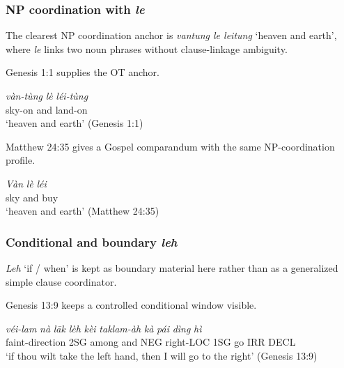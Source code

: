 \documentclass[
  11pt,
  a4paper,
]{article}
\newcommand{\tdim}[1]{\textit{#1}}
\newcommand{\tdimword}[1]{\textit{#1}}
\renewcommand{\textsc}[1]{{\footnotesize\MakeUppercase{#1}}}
\newcommand{\glossquote}[1]{`#1'}
\begin{document}
\subsubsection{\texorpdfstring{NP coordination with
\tdim{le}}{NP coordination with }}\label{np-coordination-with}

The clearest NP coordination anchor is \tdim{vantung le leitung}
\glossquote{heaven and earth}, where \tdim{le} links two noun phrases
without clause-linkage ambiguity.

Genesis 1:1 supplies the OT anchor.

\begin{exe}
\ex \label{ex:coord-le-np}
\gll \tdimword{vàn-tùng} \tdimword{lè} \tdimword{léi-tùng} \\
     sky-on and land-on \\
\glt \glossquote{heaven and earth} (Genesis 1:1)
\end{exe}

Matthew 24:35 gives a Gospel comparandum with the same NP-coordination
profile.

\begin{exe}
\ex \label{ex:coord-le-np-matt24-35}
\gll \tdimword{Vàn} \tdimword{lè} \tdimword{léi} \\
     sky and buy \\
\glt \glossquote{heaven and earth} (Matthew 24:35)
\end{exe}

\subsubsection{\texorpdfstring{Conditional and boundary
\tdim{leh}}{Conditional and boundary }}\label{conditional-and-boundary}

\tdim{Leh} \glossquote{if / when} is kept as boundary material here
rather than as a generalized simple clause coordinator.

Genesis 13:9 keeps a controlled conditional window visible.

\begin{exe}
\ex \label{ex:coord-leh-boundary}
\gll \tdimword{véi-lam} \tdimword{nà} \tdimword{lāk} \tdimword{lèh} \tdimword{kèi} \tdimword{taklam-àh} \tdimword{kà} \tdimword{pái} \tdimword{dìng} \tdimword{hì} \\
     faint-direction \textsc{2sg} among and \textsc{neg} right-\textsc{loc} \textsc{1sg} go \textsc{irr} \textsc{decl} \\
\glt \glossquote{if thou wilt take the left hand, then I will go to the right} (Genesis 13:9)
\end{exe}
\end{document}
